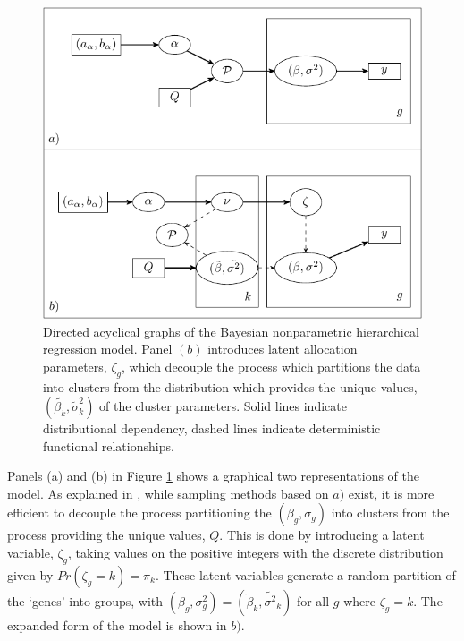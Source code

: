 \begin{figure}
\includegraphics[width=.8\textwidth]{my_dag}
\caption{Directed acyclical graphs of the Bayesian nonparametric hierarchical regression model. Panel $(b)$ introduces latent allocation parameters, $\zeta_g$, which decouple the process which partitions the data into clusters from the distribution which provides the unique values, $(\tilde{\beta_k},\tilde{\sigma}_k^2)$ of the cluster parameters. Solid lines indicate distributional dependency, dashed lines indicate deterministic functional relationships.}
\label{dag}
\end{figure}

Panels (a) and (b) in Figure \ref{dag} shows a graphical two representations of the model. As explained in \cite{neal2000}, while sampling methods based on $a)$ exist, it is more efficient to decouple the process partitioning the $(\beta_g,\sigma_g)$ into clusters from the process providing the unique values, $Q$. This is done by introducing a latent variable, $\zeta_g$, taking values on the positive integers with the discrete distribution given by $Pr(\zeta_g=k)=\pi_k$. These latent variables generate a random partition of the `genes' into groups, with $(\beta_g,\sigma^2_g)=(\tilde{\beta}_k,\tilde{\sigma^2}_k)$ for all $g$ where $\zeta_g=k$. The expanded form of the model is shown in $b)$.

